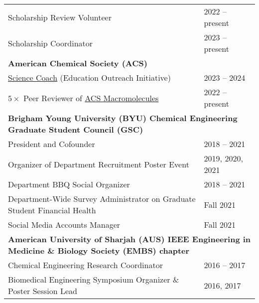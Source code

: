 \documentclass[letterpaper,11pt]{article}
\begin{document}
\begin{longtable}{@{}p{}l@{}}
  \hspace{3mm} Scholarship Review Volunteer                                                                                                  & 2022 -- present \\
  \hspace{3mm} Scholarship Coordinator                                                                                                       & 2023 -- present \\[4pt]
  \multicolumn{2}{l}{\hspace{-3mm} \bf{American Chemical Society (ACS)}} \\
  \hspace{3mm} \href{https://www.acs.org/education/outreach/science-coaches.html}{Science Coach} (Education Outreach Initiative)										& 2023 -- 2024\\
  \hspace{3mm} $5\times$ Peer Reviewer of \href{https://pubs.acs.org/journal/mamobx}{ACS Macromolecules}					& 2022 -- present\\[4pt]
  \multicolumn{2}{l}{\hspace{-3mm} \bf{Brigham Young University (BYU) Chemical Engineering Graduate Student Council (GSC)}} \\
  \hspace{3mm} President and Cofounder                                                                                                       & 2018 -- 2021 \\
  \hspace{3mm} Organizer of Department Recruitment Poster Event                                                                              & 2019, 2020, 2021 \\
  \hspace{3mm} Department BBQ Social Organizer                                                                                               & 2018 -- 2021 \\
  \hspace{3mm} Department-Wide Survey Administrator on Graduate Student Financial Health                                                      & Fall 2021 \\[4pt]
  \hspace{3mm} Social Media Accounts Manager						                                                      & Fall 2021 \\[4pt]
  \multicolumn{2}{l}{\hspace{-3mm} \bf{American University of Sharjah (AUS) IEEE Engineering in Medicine \& Biology Society (EMBS) chapter}} \\
  \hspace{3mm} Chemical Engineering Research Coordinator                                                                                     & 2016 -- 2017 \\
  \hspace{3mm} Biomedical Engineering Symposium Organizer \& Poster Session Lead                                                             & 2016, 2017 \\
\end{longtable}
\end{document}
